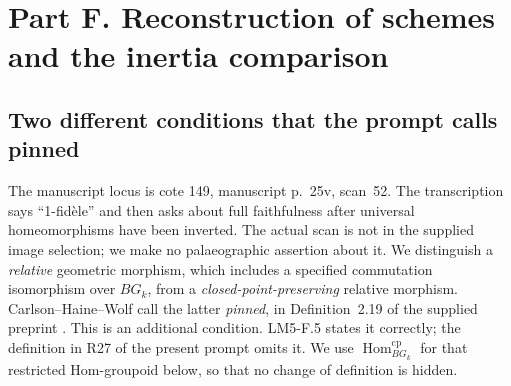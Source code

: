 \section{Part F. Reconstruction of schemes and the inertia comparison}

\subsection{Two different conditions that the prompt calls pinned}

The manuscript locus is cote 149, manuscript p.~25v, scan~52. The
transcription says ``1-fid\`ele'' and then asks about full faithfulness
after universal homeomorphisms have been inverted. The actual scan is
not in the supplied image selection; we make no palaeographic assertion
about it. We distinguish a \emph{relative} geometric morphism, which
includes a specified commutation isomorphism over $B G_k$, from a
\emph{closed-point-preserving} relative morphism. Carlson--Haine--Wolf
call the latter \emph{pinned}, in Definition~2.19 of the supplied
preprint \citep{F_CHW2024}. This is an additional condition. LM5-F.5
states it correctly; the definition in R27 of the present prompt omits
it. We use $\operatorname{Hom}^{\mathrm{cp}}_{B G_k}$ for that
restricted Hom-groupoid below, so that no change of definition is hidden.


